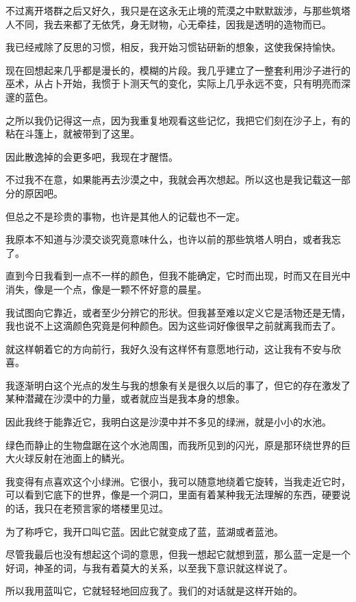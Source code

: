 \documentclass[UTF8]{article}
\begin{document}
\par 不过离开塔群之后又好久，我只是在这永无止境的荒漠之中默默跋涉，与那些筑塔人不同，我去来都了无依凭，身无财物，心无牵挂，因我是透明的造物而已。
\par 我已经戒除了反思的习惯，相反，我开始习惯钻研新的想象，这使我保持愉快。
\par 现在回想起来几乎都是漫长的，模糊的片段。我几乎建立了一整套利用沙子进行的巫术，从占卜开始，我惯于卜测天气的变化，实际上几乎永远不变，只有明亮而深邃的蓝色。
\par 之所以我仍记得这一点，因为我重复地观看这些记忆，我把它们刻在沙子上，有的粘在斗篷上，就被带到了这里。
\par 因此散逸掉的会更多吧，我现在才醒悟。
\par 不过我不在意，如果能再去沙漠之中，我就会再次想起。所以这也是我记载这一部分的原因吧。
\par 但总之不是珍贵的事物，也许是其他人的记载也不一定。
\\[0.6cm]
\par 我原本不知道与沙漠交谈究竟意味什么，也许以前的那些筑塔人明白，或者我忘了。
\par 直到今日我看到一点不一样的颜色，但我不能确定，它时而出现，时而又在目光中消失，像是一个点，像是一颗不怀好意的晨星。
\par 我试图向它靠近，或者至少分辨它的形状。但我甚至难以定义它是活物还是无情，我也说不上这滴颜色究竟是何种颜色。因为这些词好像很早之前就离我而去了。
\par 就这样朝着它的方向前行，我好久没有这样怀有意愿地行动，这让我有不安与欣喜。
\par 我逐渐明白这个光点的发生与我的想象有关是很久以后的事了，但它的存在激发了某种潜藏在沙漠中的力量，或者就应当是我本身的想象。
\par 因此我终于能靠近它，我明白这是沙漠中并不多见的绿洲，就是小小的水池。
\par 绿色而静止的生物盘踞在这个水池周围，而我所见到的闪光，原是那环绕世界的巨大火球反射在池面上的鳞光。
\par 我变得有点喜欢这个小绿洲。它很小，我可以随意地绕着它旋转，当我走近它时，可以看到它底下的世界，像是一个洞口，里面有着某种我无法理解的东西，硬要说的话，我只在老预言家的塔楼里见过。
\par 为了称呼它，我开口叫它蓝。因此它就变成了蓝，蓝湖或者蓝池。
\par 尽管我最后也没有想起这个词的意思，但我一想起它就想到蓝，那么蓝一定是一个好词，神圣的词，与我有着莫大的关系，以至我下意识就这样说了。
\par 所以我用蓝叫它，它就轻轻地回应我了。我们的对话就是这样开始的。
\end{document}
